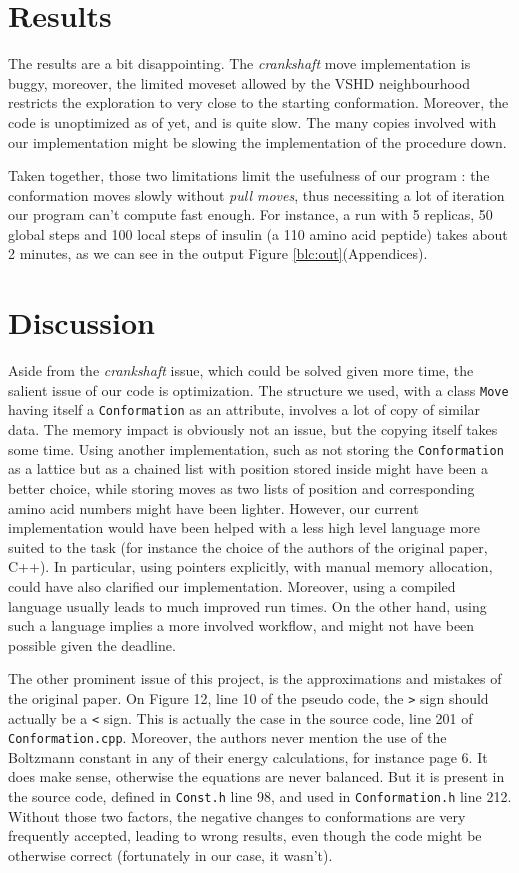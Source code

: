 \documentclass[a4paper, 12pt]{article}
\begin{document}
\section*{Results}
\label{sec:org2f98aec}
The results are a bit disappointing. The \emph{crankshaft} move implementation is buggy, moreover, the limited moveset allowed by the VSHD neighbourhood restricts the exploration to very close to the starting conformation. Moreover, the code is unoptimized as of yet, and is quite slow. The many copies involved with our implementation might be slowing the implementation of the procedure down.

Taken together, those two limitations limit the usefulness of our program : the conformation moves slowly without \emph{pull moves}, thus necessiting a lot of iteration our program can't compute fast enough. For instance, a run with 5 replicas, 50 global steps and 100 local steps of insulin (a 110 amino acid peptide) takes about 2 minutes, as we can see in the output Figure \ref{blc:out}(Appendices).

\section*{Discussion}
\label{sec:orge42e452}
Aside from the \emph{crankshaft} issue, which could be solved given more time, the salient issue of our code is optimization. The structure we used, with a class \texttt{Move} having itself a \texttt{Conformation} as an attribute, involves a lot of copy of similar data. The memory impact is obviously not an issue, but the copying itself takes some time. Using another implementation, such as not storing the \texttt{Conformation} as a lattice but as a chained list with position stored inside might have been a better choice, while storing moves as two lists of position and corresponding amino acid numbers might have been lighter. However, our current implementation would have been helped with a less high level language more suited to the task (for instance the choice of the authors of the original paper, C++). In particular, using pointers explicitly, with manual memory allocation, could have also clarified our implementation. Moreover, using a compiled language usually leads to much improved run times. On the other hand, using such a language  implies a more involved workflow, and might not have been possible given the deadline.

The other prominent issue of this project, is the approximations and mistakes of the original paper. On Figure 12, line 10 of the pseudo code, the \texttt{>} sign should actually be a \texttt{<} sign. This is actually the case in the source code, line 201 of \texttt{Conformation.cpp}. Moreover, the authors never mention the use of the Boltzmann constant in any of their energy calculations, for instance page 6. It does make sense, otherwise the equations are never balanced. But it is present in the source code, defined in \texttt{Const.h} line 98, and used in \texttt{Conformation.h} line 212. Without those two factors, the negative changes to conformations are very frequently accepted, leading to wrong results, even though the code might be otherwise correct (fortunately in our case, it wasn't).
\end{document}
